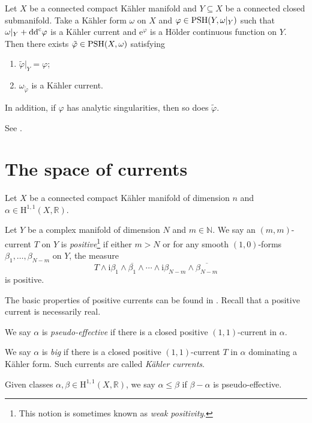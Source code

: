 \begin{theorem}\label{thm:CT-thm-refined'}Let $X$ be a connected compact Kähler manifold and $Y\subseteq X$ be a connected closed submanifold.
    Take a Kähler form $\omega$ on $X$ and $\varphi\in \mathrm{PSH}(Y,\omega|_Y)$ such that $\omega|_Y+\mathrm{dd}^{\mathrm{c}}\varphi$ is a Kähler current and $\mathrm{e}^{\varphi}$ is a H\"older continuous function on $Y$.
    Then there exists $\tilde{\varphi}\in \mathrm{PSH}(X,\omega)$ satisfying
    \begin{enumerate}
        \item\label{itm:thm:CT-thm-refined':1} $\tilde{\varphi}|_Y=\varphi$;
        \item\label{itm:thm:CT-thm-refined':2} $\omega_{\tilde{\varphi}}$ is a Kähler current.
    \end{enumerate}
        In addition, if $\varphi$ has analytic singularities, then so does $\tilde{\varphi}$.
\end{theorem}
See \cite[Theorem~6.1]{DRWNXZ}.



\section{The space of currents}
\label{sec:currents}
Let $X$ be a connected compact Kähler manifold of dimension $n$ and $\alpha\in \mathrm{H}^{1,1}(X,\mathbb{R})$.

\begin{definition}\label{def:pos_curr}
    Let $Y$ be a complex manifold of dimension $N$ and $m\in \mathbb{N}$. We say an $(m,m)$-current $T$ on $Y$ is \emph{positive}\footnote{This notion is sometimes known as \emph{weak positivity}.} if either $m>N$ or for any smooth $(1,0)$-forms $\beta_1,\ldots,\beta_{N-m}$ on $Y$, the measure
    \[
    T\wedge \mathrm{i}\beta_1\wedge \overline{\beta_1}\wedge \cdots \wedge \mathrm{i}\beta_{N-m}\wedge \overline{\beta_{N-m}}
    \]
    is positive.
\end{definition}
The basic properties of positive currents can be found in \cite[Section~III.1]{DemBook}. Recall that a positive current is necessarily real.

\begin{definition}\label{def:psefclass}
    We say $\alpha$ is \emph{pseudo-effective} if there is a closed positive $(1,1)$-current in $\alpha$.

    We say $\alpha$ is \emph{big} if there is a closed positive $(1,1)$-current $T$ in $\alpha$ dominating a Kähler form. Such currents are called \emph{Kähler currents}.
\end{definition}
Given classes $\alpha,\beta\in \mathrm{H}^{1,1}(X,\mathbb{R})$, we say $\alpha\leq \beta$ if $\beta-\alpha$ is pseudo-effective.

